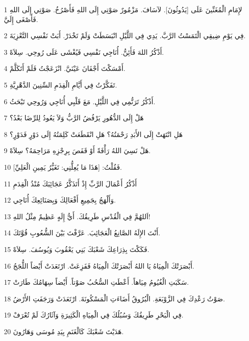 \par 1 لإِمَامِ الْمُغَنِّينَ عَلَى [يَدُوثُونَ]. لآسَافَ. مَزْمُورٌ صَوْتِي إِلَى اللهِ فَأَصْرُخُ. صَوْتِي إِلَى اللهِ فَأَصْغَى إِلَيَّ.
\par 2 فِي يَوْمِ ضِيقِي الْتَمَسْتُ الرَّبَّ. يَدِي فِي اللَّيْلِ انْبَسَطَتْ وَلَمْ تَخْدَرْ. أَبَتْ نَفْسِي التَّعْزِيَةَ.
\par 3 أَذْكُرُ اللهَ فَأَئِنُّ. أُنَاجِي نَفْسِي فَيُغْشَى عَلَى رُوحِي. سِلاَهْ.
\par 4 أَمْسَكْتَ أَجْفَانَ عَيْنَيَّ. انْزَعَجْتُ فَلَمْ أَتَكَلَّمْ.
\par 5 تَفَكَّرْتُ فِي أَيَّامِ الْقِدَمِ السِّنِينَ الدَّهْرِيَّةِ.
\par 6 أَذْكُرُ تَرَنُّمِي فِي اللَّيْلِ. مَعَ قَلْبِي أُنَاجِي وَرُوحِي تَبْحَثُ.
\par 7 هَلْ إِلَى الدُّهُورِ يَرْفُضُ الرَّبُّ وَلاَ يَعُودُ لِلرِّضَا بَعْدُ؟
\par 8 هَلِ انْتَهَتْ إِلَى الأَبَدِ رَحْمَتُهُ؟ هَلِ انْقَطَعَتْ كَلِمَتُهُ إِلَى دَوْرٍ فَدَوْرٍ؟
\par 9 هَلْ نَسِيَ اللهُ رَأْفَةً أَوْ قَفَصَ بِرِجْزِهِ مَرَاحِمَهُ؟ سِلاَهْ.
\par 10 فَقُلْتُ: [هَذَا مَا يُعِلُّنِي: تَغَيُّرُ يَمِينِ الْعَلِيِّ].
\par 11 أَذْكُرُ أَعْمَالَ الرَّبِّ إِذْ أَتَذَكَّرُ عَجَائِبَكَ مُنْذُ الْقِدَمِ
\par 12 وَأَلْهَجُ بِجَمِيعِ أَفْعَالِكَ وَبِصَنَائِعِكَ أُنَاجِي.
\par 13 اَللهُمَّ فِي الْقُدْسِ طَرِيقُكَ. أَيُّ إِلَهٍ عَظِيمٌ مِثْلُ اللهِ!
\par 14 أَنْتَ الإِلَهُ الصَّانِعُ الْعَجَائِبَ. عَرَّفْتَ بَيْنَ الشُّعُوبِ قُوَّتَكَ.
\par 15 فَكَكْتَ بِذِرَاعِكَ شَعْبَكَ بَنِي يَعْقُوبَ وَيُوسُفَ. سِلاَهْ.
\par 16 أَبْصَرَتْكَ الْمِيَاهُ يَا اللهُ أَبْصَرَتْكَ الْمِيَاهُ فَفَزِعَتْ. ارْتَعَدَتْ أَيْضاً اللُّجَجُ.
\par 17 سَكَبَتِ الْغُيُومُ مِيَاهاً. أَعْطَتِ السُّحُبُ صَوْتاً. أَيْضاً سِهَامُكَ طَارَتْ.
\par 18 صَوْتُ رَعْدِكَ فِي الزَّوْبَعَةِ. الْبُرُوقُ أَضَاءَتِ الْمَسْكُونَةَ. ارْتَعَدَتْ وَرَجَفَتِ الأَرْضُ.
\par 19 فِي الْبَحْرِ طَرِيقُكَ وَسُبُلُكَ فِي الْمِيَاهِ الْكَثِيرَةِ وَآثَارُكَ لَمْ تُعْرَفْ.
\par 20 هَدَيْتَ شَعْبَكَ كَالْغَنَمِ بِيَدِ مُوسَى وَهَارُونَ.


